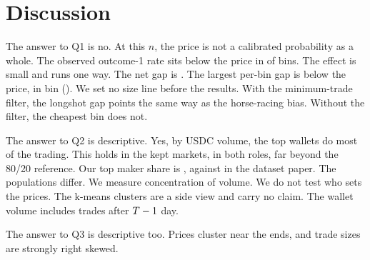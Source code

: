 \section{Discussion}\label{sec:discussion}
The answer to Q1 is no.
At this $n$, the price is not a calibrated probability as a whole.
The observed outcome-1 rate sits below the price in \GapNegBinsMain{} of \GapBinsTotal{} bins.
The effect is small and runs one way.
The net gap is \GapNetDiffMain.
The largest per-bin gap is \LargestGapAbs{} below the price, in bin \LargestGapBin{} ().
We set no size line before the results.
With the minimum-trade filter, the longshot gap points the same way as the horse-racing bias.
Without the filter, the cheapest bin does not.

The answer to Q2 is descriptive.
Yes, by USDC volume, the top wallets do most of the trading.
This holds in the kept markets, in both roles, far beyond the 80/20 reference.
Our top \TopOneLabel{} maker share is \MakerTopOneShare, against \PaperTopShare{} in the dataset paper.
The populations differ.
We measure concentration of volume.
We do not test who sets the prices.
The k-means clusters are a side view and carry no claim.
The wallet volume includes trades after $T-1$ day.

The answer to Q3 is descriptive too.
Prices cluster near the ends, and trade sizes are strongly right skewed.
